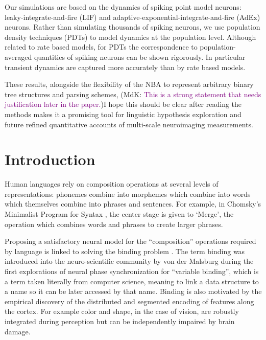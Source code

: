 \documentclass[10pt]{article}
\newcommand{\noteMdK}[2]{(MdK: \textcolor{purple}{#1})}
\newcommand{\noteMP}[3]{(MP: \textcolor{blue}{#1})}
\begin{document}
Our simulations are based on the dynamics of spiking point model neurons: leaky-integrate-and-fire (LIF) and adaptive-exponential-integrate-and-fire (AdEx) neurons.
Rather than simulating thousands of spiking neurons, we use population density techniques (PDTs) to model dynamics at the population level. Although related to rate based models, 
for PDTs the correspondence to population-averaged quantities of spiking neurons can be shown rigorously.
In particular transient dynamics are captured more accurately than by rate based models.

These results, alongside the flexibility of the NBA to represent arbitrary binary tree structures and parsing schemes, \noteMdK{This is a strong statement that needs justification later in the paper.} \noteMP{I hope this should be clear after reading the methods}
makes it a promising tool for linguistic hypothesis exploration and future refined quantitative accounts of multi-scale neuroimaging measurements.


\section{Introduction}

{\label{931947}}

Human languages rely on composition operations at several levels of representations: phonemes combine into morphemes which combine into words which themselves combine into 
phrases and sentences. For example, in Chomsky's Minimalist Program for Syntax \cite{Chomsky_2013}, the center stage is given to `Merge', the operation which combines words and phrases to create larger phrases.

Proposing a satisfactory neural model for the ``composition'' operations required by language is linked to solving the binding problem \cite{marcus14}.
The term binding was introduced into the neuro-scientific community by von der Malsburg\cite{von_der_Malsburg_1994} during the first explorations of neural phase synchronization for ``variable binding'', which is a term taken literally from computer science, meaning to link a data structure to a name so it can be later accessed by that name.
Binding is also motivated by the empirical discovery of the distributed and segmented encoding of features along the cortex. For example color and shape, in the case of vision, are robustly integrated during perception but can be independently impaired by brain damage.
\end{document}
